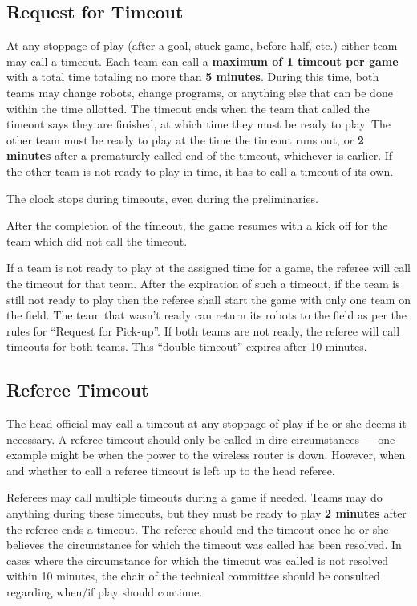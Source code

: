 \documentclass[12pt]{article}
\begin{document}
\subsection{Request for Timeout}
\label{sec:request_for_timeout}

At any stoppage of play (after a goal, stuck game, before half, etc.) either team may call a timeout. Each team can call a \textbf{maximum of 1 timeout per game} with a total time totaling no more than \textbf{5 minutes}. During this time, both teams may change robots, change programs, or anything else that can be done within the time allotted. 
The timeout ends when the team that called the timeout says they are finished, at which time they must be ready to play. The other team must be ready to play at the time the timeout runs out, or \textbf{2 minutes} after a prematurely called end of the timeout, whichever is earlier. If the other team is not ready to play in time, it has to call a timeout of its own.
  
The clock stops during timeouts, even during the preliminaries.

After the completion of the timeout, the game resumes with a kick off for the team which did not call the timeout.

If a team is not ready to play at the assigned time for a game, the referee will call the timeout for that team. After the expiration of such a timeout, if the team is still not ready to play then the referee shall start the game with only one team on the field.  The team that wasn't ready can return its robots to the field as per the rules for ``Request for Pick-up''. If both teams are not ready, the referee will call timeouts for both teams. This ``double timeout'' expires after 10 minutes.

\subsection{Referee Timeout}
\label{sec:referee_timeout}
The head official may call a timeout at any stoppage of play if he or she deems it necessary.  A referee timeout should only be called in dire circumstances --- one example might be when the power to the wireless router is down.  However, when and whether to call a referee timeout is left up to the head referee.

Referees may call multiple timeouts during a game if needed.  Teams may do anything during these timeouts, but they must be ready to play \textbf{2 minutes} after the referee ends a timeout.  The referee should end the timeout once he or she believes the circumstance for which the timeout was called has been resolved.  In cases where the circumstance for which the timeout was called is not resolved within 10 minutes, the chair of the technical committee should be consulted regarding when/if play should continue.
\end{document}
